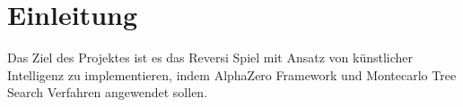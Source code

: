 \section{Einleitung}
Das Ziel des Projektes ist es das Reversi Spiel mit Ansatz von künstlicher Intelligenz zu implementieren, indem AlphaZero Framework und Montecarlo Tree Search Verfahren angewendet sollen. 




